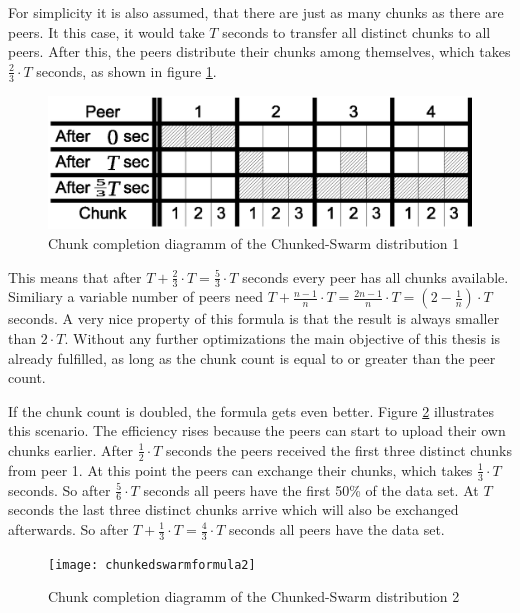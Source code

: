 For simplicity it is also assumed, that there are just as many chunks as there are peers. It this case, it would take $T$ seconds to transfer all distinct chunks to all peers. After this, the peers distribute their chunks among themselves, which takes $\frac{2}{3} \cdot T$ seconds, as shown in figure \ref{fig:chunkedswarmformula1}.

\begin{figure}[H]
\centering
\includegraphics[width=12cm]{chunkedswarmformula1}
\caption{Chunk completion diagramm of the Chunked-Swarm distribution 1}
\label{fig:chunkedswarmformula1}
\end{figure}

This means that after $T + \frac{2}{3} \cdot T = \frac{5}{3} \cdot T$ seconds every peer has all chunks available. Similiary a variable number of peers need $T + \frac{n - 1}{n} \cdot T = \frac{2n - 1}{n} \cdot T = (2 - \frac{1}{n}) \cdot T$ seconds. A very nice property of this formula is that the result is always smaller than $2 \cdot T$. Without any further optimizations the main objective of this thesis is already fulfilled, as long as the chunk count is equal to or greater than the peer count.

If the chunk count is doubled, the formula gets even better. Figure \ref{fig:chunkedswarmformula2} illustrates this scenario. The efficiency rises because the peers can start to upload their own chunks earlier. After $\frac{1}{2} \cdot T$ seconds the peers received the first three distinct chunks from peer 1. At this point the peers can exchange their chunks, which takes $\frac{1}{3} \cdot T$ seconds. So after $\frac{5}{6} \cdot T$ seconds all peers have the first 50\% of the data set. At $T$ seconds the last three distinct chunks arrive which will also be exchanged afterwards. So after $T + \frac{1}{3} \cdot T = \frac{4}{3} \cdot T$ seconds all peers have the data set.

\begin{figure}[H]
\centering
\texttt{[image: chunkedswarmformula2]}
\caption{Chunk completion diagramm of the Chunked-Swarm distribution 2}
\label{fig:chunkedswarmformula2}
\end{figure}
